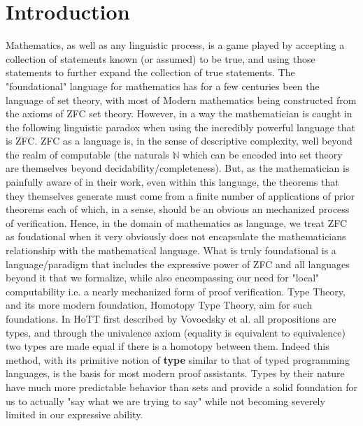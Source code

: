 \documentclass[12pt]{amsart}
\begin{document}
\newtheorem{thm}{\noindent\bf Theorem:}[section]
\newtheorem{lem}{\noindent\bf Lemma:}[section]
\newtheorem{cor}{\noindent\bf Corrallary:}[section]
\newenvironment{myproof}{\noindent\textbf{Proof:}}{QED }
\newcommand{\N}{\mathbb{N}}
\newcommand{\bigO}{\mathbb{O}}
\newcommand{\pyspace}{\hspace{12pt}}


\section{Introduction}

Mathematics, as well as any linguistic process, is a game played by accepting a collection of statements known (or assumed) to be true, and using those statements to further expand the collection of true statements. The "foundational" language for mathematics has for a few centuries been the language of set theory, with most of Modern mathematics being constructed from the axioms of ZFC set theory. However, in a way the mathematician is caught in the following linguistic paradox when using the incredibly powerful language that is ZFC. ZFC as a language is, in the sense of descriptive complexity, well beyond the realm of computable (the naturals $\N$ which can be encoded into set theory are themselves beyond decidability/completeness). But, as the mathematician is painfully aware of in their work, even within this language, the theorems that they themselves generate must come from a finite number of applications of prior theorems each of which, in a sense, should be an obvious an mechanized process of verification. Hence, in the domain of mathematics as language, we treat ZFC as foudational when it very obviously does not encapsulate the mathematicians relationship with the mathematical language. What is truly foundational is a language/paradigm that includes the expressive power of ZFC and all languages beyond it that we formalize, while also encompassing our need for "local" computability i.e. a nearly mechanized form of proof verification. Type Theory, and its more modern foundation, Homotopy Type Theory, aim for such foundations. In HoTT first described by Vovoedsky et al. all propositions are types, and through the univalence axiom (equality is equivalent to equivalence) two types are made equal if there is a homotopy between them. Indeed this method, with its primitive notion of \textbf{type} similar to that of typed programming languages, is the basis for most modern proof assistants. Types by their nature have much more predictable behavior than sets and provide a solid foundation for us to actually "say what we are trying to say" while not becoming severely limited in our expressive ability. \newline
\end{document}
